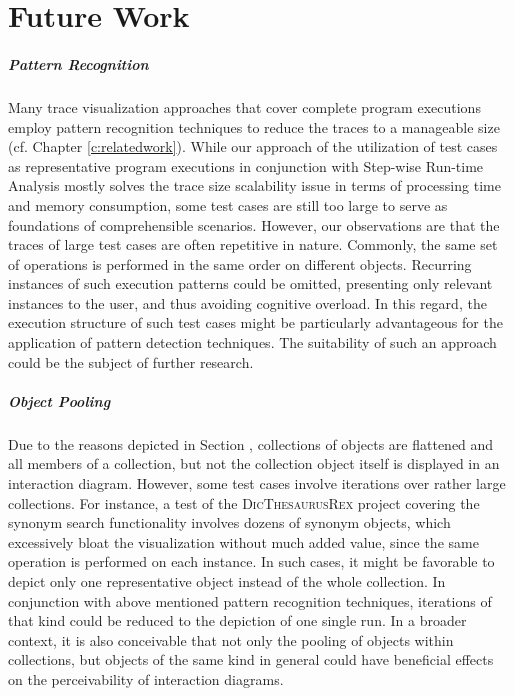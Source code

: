 \chapter{Future Work}
\label{c:futurework}


\paragraph{Pattern Recognition} Many trace visualization approaches that cover complete program executions employ pattern recognition techniques to reduce the traces to a manageable size (cf. Chapter \ref{c:relatedwork}).
While our approach of the utilization of test cases as representative program executions in conjunction with Step-wise Run-time Analysis mostly solves the trace size scalability issue in terms of processing time and memory consumption, some test cases are still too large to serve as foundations of comprehensible scenarios.
However, our observations are that the traces of large test cases are often repetitive in nature. Commonly, the same set of operations is performed in the same order on different objects.
Recurring instances of such execution patterns could be omitted, presenting only relevant instances to the user, and thus avoiding cognitive overload.
In this regard, the execution structure of such test cases might be particularly advantageous for the application of pattern detection techniques.
The suitability of such an approach could be the subject of further research.

\paragraph{Object Pooling} Due to the reasons depicted in Section , collections of objects are flattened and all members of a collection, but not the collection object itself is displayed in an interaction diagram. However, some test cases involve iterations over rather large collections.
For instance, a test of the \textsc{DicThesaurusRex} project covering the synonym search functionality involves dozens of synonym objects, which excessively bloat the visualization without much added value, since the same operation is performed on each instance.
In such cases, it might be favorable to depict only one representative object instead of the whole collection.
In conjunction with above mentioned pattern recognition techniques, iterations of that kind could be reduced to the depiction of one single run.
In a broader context, it is also conceivable that not only the pooling of objects within collections, but objects of the same kind in general could have beneficial effects on the perceivability of interaction diagrams.

